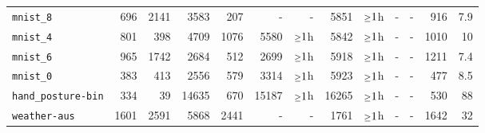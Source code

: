 \begin{tabular}{lrrrrrrrrrrrr}
\texttt{mnist\_8} & 696 & 2141 & 3583 & 207 & - & - & 5851 & $\mathsmaller{\geq}1$h & - & - & 916 & 7.9\\
\texttt{mnist\_4} & 801 & 398 & 4709 & 1076 & 5580 & $\mathsmaller{\geq}1$h & 5842 & $\mathsmaller{\geq}1$h & - & - & 1010 & 10\\
\texttt{mnist\_6} & 965 & 1742 & 2684 & 512 & 2699 & $\mathsmaller{\geq}1$h & 5918 & $\mathsmaller{\geq}1$h & - & - & 1211 & 7.4\\
\texttt{mnist\_0} & 383 & 413 & 2556 & 579 & 3314 & $\mathsmaller{\geq}1$h & 5923 & $\mathsmaller{\geq}1$h & - & - & 477 & 8.5\\
\texttt{hand\_posture-bin} & 334 & 39 & 14635 & 670 & 15187 & $\mathsmaller{\geq}1$h & 16265 & $\mathsmaller{\geq}1$h & - & - & 530 & 88\\
\texttt{weather-aus} & 1601 & 2591 & 5868 & 2441 & - & - & 1761 & $\mathsmaller{\geq}1$h & - & - & 1642 & 32\\
\bottomrule
\end{tabular}
